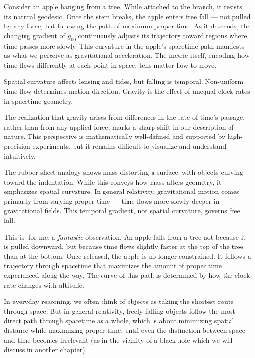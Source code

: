 Consider an apple hanging from a tree. While attached to the branch, it resists its natural geodesic. Once the stem breaks, the apple enters free fall — not pulled by any force, but following the path of maximum proper time. As it descends, the changing gradient of \( g_{00} \) continuously adjusts its trajectory toward regions where time passes more slowly. This curvature in the apple's spacetime path manifests as what we perceive as gravitational acceleration. The metric itself, encoding how time flows differently at each point in space, tells matter how to move.

Spatial curvature affects lensing and tides, but falling is temporal. Non-uniform time flow determines motion direction. Gravity is the effect of unequal clock rates in spacetime geometry.

\begin{commentary}

The realization that gravity arises from differences in the rate of time’s passage, rather than from any applied force, marks a sharp shift in our description of nature. This perspective is mathematically well-defined and supported by high-precision experiments, but it remains difficult to visualize and understand intuitively.

The rubber sheet analogy shows mass distorting a surface, with objects curving toward the indentation. While this conveys how mass alters geometry, it emphasizes spatial curvature. In general relativity, gravitational motion comes primarily from varying proper time — time flows more slowly deeper in gravitational fields. This temporal gradient, not spatial curvature, governs free fall.

This is, for me, a \textit{fantastic} observation. An apple falls from a tree not because it is pulled downward, but because time flows slightly faster at the top of the tree than at the bottom. Once released, the apple is no longer constrained. It follows a trajectory through spacetime that maximizes the amount of proper time experienced along the way. The curve of this path is determined by how the clock rate changes with altitude.

In everyday reasoning, we often think of objects as taking the shortest route through space. But in general relativity, freely falling objects follow the most direct path through spacetime as a whole, which is about minimizing spatial distance while maximizing proper time, until even the distinction between space and time becomes irrelevant (as in the vicinity of a black hole which we will discuss in another chapter).

\end{commentary}
